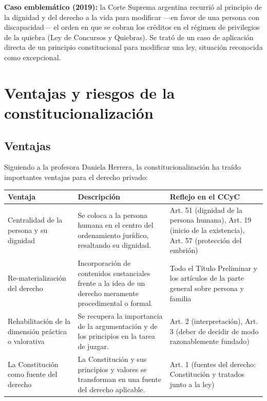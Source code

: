 \documentclass[12pt,oneside]{book}
\begin{document}
\begin{important}
\textbf{Caso emblemático (2019):} la Corte Suprema argentina recurrió al principio de la dignidad y del derecho a la vida para modificar —en favor de una persona con discapacidad— el orden en que se cobran los créditos en el régimen de privilegios de la quiebra (Ley de Concursos y Quiebras). Se trató de un caso de aplicación directa de un principio constitucional para modificar una ley, situación reconocida como excepcional.
\end{important}

\section{Ventajas y riesgos de la constitucionalización}

\subsection{Ventajas}

Siguiendo a la profesora Daniela Herrera, la constitucionalización ha traído importantes ventajas para el derecho privado:

\begin{longtable}{
    >{\raggedright\arraybackslash}p{}
    >{\raggedright\arraybackslash}p{}
    >{\raggedright\arraybackslash}p{}
}
\toprule
\textbf{Ventaja} & \textbf{Descripción} & \textbf{Reflejo en el CCyC} \\
\midrule
\endhead
Centralidad de la persona y su dignidad &
Se coloca a la persona humana en el centro del ordenamiento jurídico, resaltando su dignidad. &
Art. 51 (dignidad de la persona humana), Art. 19 (inicio de la existencia), Art. 57 (protección del embrión) \\
Re-materialización del derecho &
Incorporación de contenidos sustanciales frente a la idea de un derecho meramente procedimental o formal. &
Todo el Título Preliminar y los artículos de la parte general sobre persona y familia \\
Rehabilitación de la dimensión práctica o valorativa &
Se recupera la importancia de la argumentación y de los principios en la tarea de juzgar. &
Art. 2 (interpretación), Art. 3 (deber de decidir de modo razonablemente fundado) \\
La Constitución como fuente del derecho &
La Constitución y sus principios y valores se transforman en una fuente del derecho aplicable. &
Art. 1 (fuentes del derecho: Constitución y tratados junto a la ley) \\
\bottomrule
\end{longtable}
\end{document}
